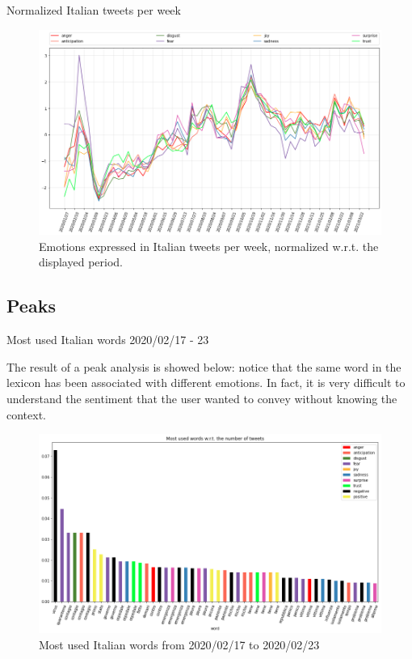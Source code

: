\documentclass[8pt]{beamer}  %
\begin{document}
\begin{frame}{Normalized Italian tweets per week}
	
	\begin{figure}[h]
    	\includegraphics[scale=.3]{assets/img/it_emotions_normalized.png}
    	\caption{Emotions expressed in Italian tweets per week, normalized w.r.t. the displayed period.}
    	\label{fig:it_emotion_weekly_norm}
    \end{figure}

\end{frame}

\subsection{Peaks}
\begin{frame}{Most used Italian words 2020/02/17 - 23}
	
	The result of a peak analysis is showed below: notice that the same word in the lexicon has been associated with different emotions. In fact, it is very difficult to understand the sentiment that the user wanted to convey without knowing the context.
	
	\begin{figure}[h]
    	\includegraphics[scale=.3]{assets/img/it_2020_02_17_most_used_words.png}
    	\caption{Most used Italian words from 2020/02/17 to 2020/02/23}
    	\label{fig:it_2020_02_17_most_used_words}
    \end{figure}
	
\end{frame}
\end{document}
